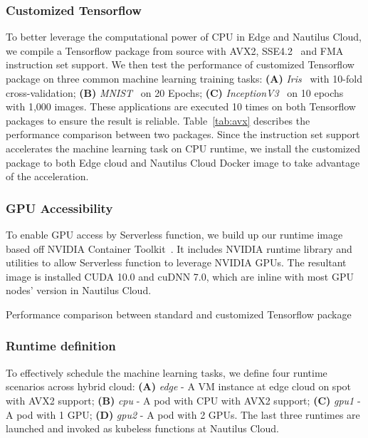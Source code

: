  \subsubsection{Customized Tensorflow}
 To better leverage the computational power of CPU in Edge and Nautilus Cloud, we compile a Tensorflow package from source with AVX2, SSE4.2~\cite{ref:avx} and FMA~\cite{ref:fma} instruction set support. We then test the performance of customized Tensorflow package on three common machine learning training tasks: \textbf{(A)} \textit{Iris}~\cite{ref:iris} with 10-fold cross-validation; \textbf{(B)} \textit{MNIST}~\cite{ref:mnist} on 20 Epochs; \textbf{(C)} \textit{InceptionV3}~\cite{ref:v3} on 10 epochs with 1,000 images. These applications are executed 10 times on both Tensorflow packages to ensure the result is reliable. Table~\ref{tab:avx} describes the performance comparison between two packages. Since the instruction set support accelerates the machine learning task on CPU runtime, we install the customized package to both Edge cloud and Nautilus Cloud Docker image to take advantage of the acceleration.
 
 \BlankLine
 \subsubsection{GPU Accessibility}
 To enable GPU access by Serverless function, we build up our runtime image based off NVIDIA Container Toolkit~\cite{ref:nvidia}. It includes NVIDIA runtime library and utilities to allow Serverless function to leverage NVIDIA GPUs. The resultant image is installed CUDA 10.0 and cuDNN 7.0, which are inline with most GPU nodes' version in Nautilus Cloud. 
 
\begin{table}[]
\centering

\caption{Performance comparison between standard and customized Tensorflow package}
\label{tab:avx}
\end{table}
 
 \BlankLine
 \subsubsection{Runtime definition}
 To effectively schedule the machine learning tasks, we define four runtime scenarios across hybrid cloud: \textbf{(A)} \textit{edge} - A VM instance at edge cloud on spot with AVX2 support; \textbf{(B)} \textit{cpu} - A pod with CPU with AVX2 support; \textbf{(C)} \textit{gpu1} - A pod with 1 GPU; \textbf{(D)} \textit{gpu2} - A pod with 2 GPUs. The last three runtimes are launched and invoked as kubeless functions at Nautilus Cloud. 
 
